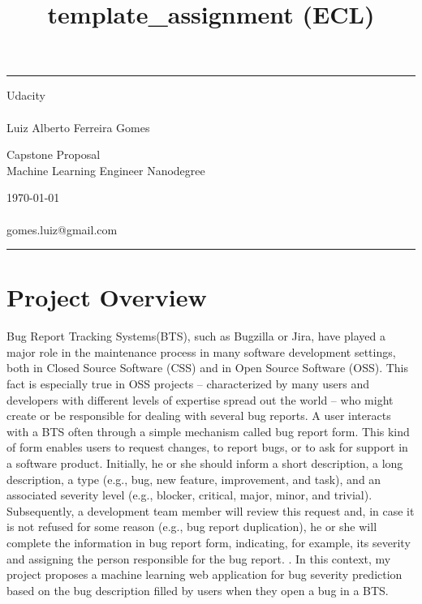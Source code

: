 \documentclass[a4paper]{article}
\begin{document}
\title{template_assignment (ECL)}
\fancyhead[C]{}
\hrule \medskip 
\begin{minipage}{0.295\textwidth}
\raggedright
Udacity\\ 
\footnotesize 
\hfill\\
Luiz Alberto Ferreira Gomes
\end{minipage}
\begin{minipage}{0.4\textwidth} 
\centering 
\large 
Capstone Proposal\\ 
\normalsize 
Machine Learning Engineer Nanodegree\\ 
\end{minipage}
\begin{minipage}{0.295\textwidth} 
\raggedleft
\today\\ 
\footnotesize 
\hfill\\
gomes.luiz@gmail.com 
\end{minipage}
\medskip\hrule 
\bigskip

\section{Project Overview}
Bug Report Tracking Systems(BTS), such as Bugzilla or Jira, have played a major role in the maintenance process in many software development settings, both in Closed Source Software (CSS) and in Open Source Software (OSS). This fact is especially true in OSS projects -- characterized by many users and developers with different levels of expertise spread out the world -- who might create or be responsible for dealing with several bug reports. A user interacts with a BTS often through a simple mechanism called bug report form\cite{Tian:2012}. This kind of form enables users to request changes, to report bugs, or to ask for support in a software product. Initially, he or she should inform a short description, a long description, a type (e.g., bug, new feature, improvement, and task), and an associated severity level (e.g., blocker, critical, major, minor, and trivial). Subsequently, a development team member will review this request and, in case it is not refused for some reason (e.g., bug report duplication), he or she will complete the information in bug report form, indicating, for example, its severity and assigning the person responsible for the bug report. \cite{Cavalcanti:2014}. In this context, my project proposes a machine learning web application for bug severity prediction based on the bug description filled by users when they open a bug in a BTS.
\end{document}
